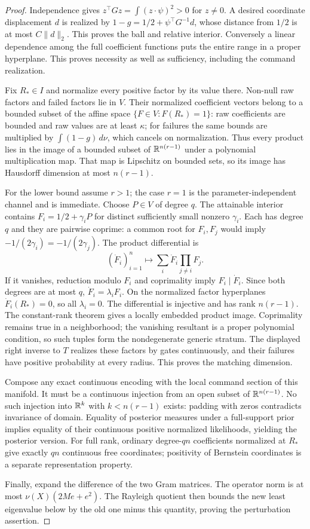 \begin{proof}
Independence gives $z^\top Gz=\int(z\cdot\psi)^2>0$ for $z\ne0$. A desired coordinate displacement $d$ is realized by
$1-g=1/2+\psi^\top G^{-1}d$, whose distance from $1/2$ is at most $C\|d\|_2$. This proves the ball and relative interior. Conversely a linear dependence among the full coefficient functions puts the entire range in a proper hyperplane. This proves necessity as well as sufficiency, including the command realization.

Fix $R_*\in I$ and normalize every positive factor by its value there. Non-null raw factors and failed factors lie in $V$. Their normalized coefficient vectors belong to a bounded subset of the affine space $\{F\in V:F(R_*)=1\}$: raw coefficients are bounded and raw values are at least $\kappa$; for failures the same bounds are multiplied by $\int(1-g)\,d\nu$, which cancels on normalization. Thus every product lies in the image of a bounded subset of $\mathbb R^{n(r-1)}$ under a polynomial multiplication map. That map is Lipschitz on bounded sets, so its image has Hausdorff dimension at most $n(r-1)$.

For the lower bound assume $r>1$; the case $r=1$ is the parameter-independent channel and is immediate. Choose $P\in V$ of degree $q$. The attainable interior contains $F_i=1/2+\gamma_iP$ for distinct sufficiently small nonzero $\gamma_i$. Each has degree $q$ and they are pairwise coprime: a common root for $F_i,F_j$ would imply $-1/(2\gamma_i)=-1/(2\gamma_j)$. The product differential is
\[
 (\dot F_i)_{i=1}^n\longmapsto\sum_i\dot F_i\prod_{j\ne i}F_j.
\]
If it vanishes, reduction modulo $F_i$ and coprimality imply $F_i\mid\dot F_i$. Since both degrees are at most $q$, $\dot F_i=\lambda_iF_i$. On the normalized factor hyperplanes $\dot F_i(R_*)=0$, so all $\lambda_i=0$. The differential is injective and has rank $n(r-1)$. The constant-rank theorem gives a locally embedded product image. Coprimality remains true in a neighborhood; the vanishing resultant is a proper polynomial condition, so such tuples form the nondegenerate generic stratum. The displayed right inverse to $T$ realizes these factors by gates continuously, and their failures have positive probability at every radius. This proves the matching dimension.

Compose any exact continuous encoding with the local command section of this manifold. It must be a continuous injection from an open subset of $\mathbb R^{n(r-1)}$. No such injection into $\mathbb R^k$ with $k<n(r-1)$ exists: padding with zeros contradicts invariance of domain. Equality of posterior measures under a full-support prior implies equality of their continuous positive normalized likelihoods, yielding the posterior version. For full rank, ordinary degree-$qn$ coefficients normalized at $R_*$ give exactly $qn$ continuous free coordinates; positivity of Bernstein coordinates is a separate representation property.

Finally, expand the difference of the two Gram matrices. The operator norm is at most $\nu(X)(2Me+e^2)$. The Rayleigh quotient then bounds the new least eigenvalue below by the old one minus this quantity, proving the perturbation assertion.
\end{proof}


